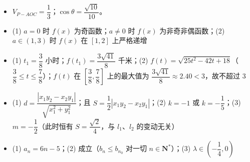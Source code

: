 \begin{itemize}[leftmargin=2.6em]
  \item[\textbf{19.}] \(V_{P-AOC}=\dfrac{1}{3}\)；\(\cos\theta=\dfrac{\sqrt{10}}{10}\)。
  \item[\textbf{20.}] (1) \(a=0\) 时 \(f(x)\) 为奇函数；\(a\neq0\) 时 \(f(x)\) 为非奇非偶函数；(2) \(a\in(1,3)\) 时 \(f(x)\) 在 \([1,2]\) 上严格递增
  \item[\textbf{21.}] (1) \(t_{1}=\dfrac{3}{8}\) 小时；\(f(t_{1})=\dfrac{3\sqrt{41}}{8}\) 千米；(2) \(f(t)=\sqrt{25t^{2}-42t+18}\)（\(\dfrac{3}{8}\leqslant t\leqslant\dfrac{7}{8}\)）；\(f(t)\) 在 \(\left[\dfrac{3}{8},\dfrac{7}{8}\right]\) 上的最大值为 \(\dfrac{3\sqrt{41}}{8}\approx 2.40<3\)，故不超过 3
  \item[\textbf{22.}] (1) \(d=\dfrac{|x_{1}y_{2}-x_{2}y_{1}|}{\sqrt{x_{1}^{2}+y_{1}^{2}}}\)；且 \(S=\dfrac{1}{2}|x_{1}y_{2}-x_{2}y_{1}|\)；(2) \(k=-1\) 或 \(k=-\dfrac{1}{5}\)；(3) \(m=-\dfrac{1}{2}\)（此时恒有 \(S=\dfrac{\sqrt{2}}{4}\)，与 \(l_{1}\)、\(l_{2}\) 的变动无关）
  \item[\textbf{23.}] (1) \(a_{n}=6n-5\)；(2) 成立（\(b_{n}\leqslant b_{n_{0}}\) 对一切 \(n\in\mathbf{N}^{\ast}\)）；(3) \(\lambda\in\left(-\dfrac{1}{4},0\right)\)
\end{itemize}
